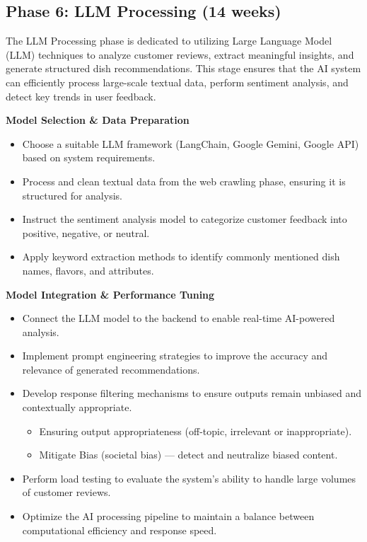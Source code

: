 \subsection*{Phase 6: LLM Processing (14 weeks)}
The LLM Processing phase is dedicated to utilizing Large Language Model (LLM) techniques to analyze customer reviews, extract meaningful insights, and generate structured dish recommendations. This stage ensures that the AI system can efficiently process large-scale textual data, perform sentiment analysis, and detect key trends in user feedback.

\textbf{Model Selection \& Data Preparation}
\begin{itemize}
\item Choose a suitable LLM framework (LangChain, Google Gemini, Google API) based on system requirements.
\item Process and clean textual data from the web crawling phase, ensuring it is structured for analysis.
\item Instruct the sentiment analysis model to categorize customer feedback into positive, negative, or neutral.
\item Apply keyword extraction methods to identify commonly mentioned dish names, flavors, and attributes.
\end{itemize}

\textbf{Model Integration \& Performance Tuning}
\begin{itemize}
\item Connect the LLM model to the backend to enable real-time AI-powered analysis.
\item Implement prompt engineering strategies to improve the accuracy and relevance of generated recommendations.
\item Develop response filtering mechanisms to ensure outputs remain unbiased and contextually appropriate.
	\begin{itemize}
	\item Ensuring output appropriateness (off-topic, irrelevant or inappropriate).
	\item Mitigate Bias (societal bias) — detect and neutralize biased content.
	\end{itemize}
\item Perform load testing to evaluate the system’s ability to handle large volumes of customer reviews.
\item Optimize the AI processing pipeline to maintain a balance between computational efficiency and response speed.
\end{itemize}

